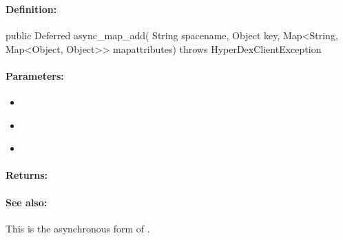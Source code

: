 \pagebreak
\subsubsection{}
\label{api:java:async_map_add}


\paragraph{Definition:}
\begin{javacode}
public Deferred async_map_add(
        String spacename,
        Object key,
        Map<String, Map<Object, Object>> mapattributes) throws HyperDexClientException
\end{javacode}

\paragraph{Parameters:}
\begin{itemize}[noitemsep]
\item {}\\

\item {}\\

\item {}\\

\end{itemize}

\paragraph{Returns:}


\paragraph{See also:}  This is the asynchronous form of .

\pagebreak
\subsubsection{}
\label{api:java:cond_map_add}


